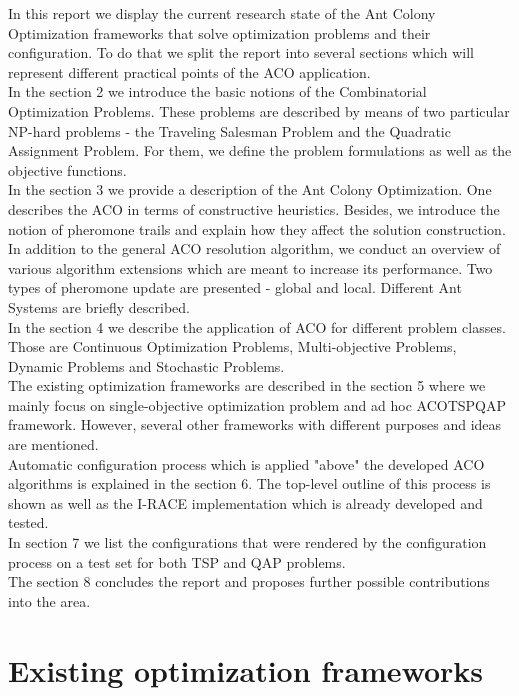 \documentclass[12pt]{article}
\begin{document}
In this report we display the current research state of the Ant Colony Optimization frameworks that solve optimization problems and their configuration. To do that we split the report into several sections which will represent different practical points of the ACO application. \\
In the section 2 we introduce the basic notions of the Combinatorial Optimization Problems. These problems are described by means of two particular NP-hard problems - the  Traveling Salesman Problem and the Quadratic Assignment Problem. For them, we define the problem formulations as well as the objective functions. \\
In the section 3 we provide a description of the Ant Colony Optimization. One describes the ACO in terms of constructive heuristics. Besides, we introduce the notion of pheromone trails and explain how they affect the solution construction. In addition to the general ACO resolution algorithm, we conduct an overview of various algorithm extensions which are meant to increase its performance. Two types of pheromone update are presented - global and local. Different Ant Systems are briefly described. \\
In the section 4 we describe the application of ACO for different problem classes. Those are Continuous Optimization Problems, Multi-objective Problems, Dynamic Problems and Stochastic Problems. \\
The existing optimization frameworks are described in the section 5 where we mainly focus on single-objective optimization problem and ad hoc ACOTSPQAP framework. However, several other frameworks with different purposes and ideas are mentioned. \\
Automatic configuration process which is applied "above" the developed ACO algorithms is explained in the section 6. The top-level outline of this process is shown as well as the I-RACE implementation which is already developed and tested. \\
In section 7 we list the configurations that were rendered by the configuration process on a test set for both TSP and QAP problems. \\
The section 8 concludes the report and proposes further possible contributions into the area.









\section{Existing optimization frameworks}
\end{document}

